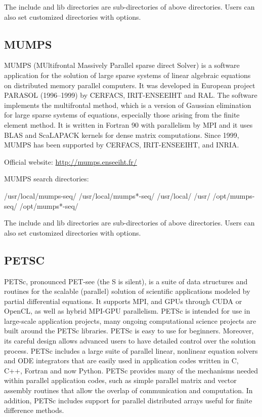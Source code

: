 The include and lib directories are sub-directories of above directories. Users can also set customized directories with options.

\subsection{MUMPS}
MUMPS (MUltifrontal Massively Parallel sparse direct Solver) is a software application for the solution of large sparse systems of linear algebraic equations on distributed memory parallel computers. It was developed in European project PARASOL (1996–1999) by CERFACS, IRIT-ENSEEIHT and RAL. The software implements the multifrontal method, which is a version of Gaussian elimination for large sparse systems of equations, especially those arising from the finite element method. It is written in Fortran 90 with parallelism by MPI and it uses BLAS and ScaLAPACK kernels for dense matrix computations. Since 1999, MUMPS has been supported by CERFACS, IRIT-ENSEEIHT, and INRIA. 

Official website: \url{http://mumps.enseeiht.fr/}

MUMPS search directories:
\begin{evb}
/usr/local/mumps-seq/
/usr/local/mumps*-seq/
/usr/local/
/usr/
/opt/mumps-seq/
/opt/mumps*-seq/
\end{evb}

The include and lib directories are sub-directories of above directories. Users can also set customized directories with options.

\subsection{PETSC}
PETSc, pronounced PET-see (the S is silent), is a suite of data structures and routines for the scalable (parallel) solution of scientific applications modeled by partial differential equations. It supports MPI, and GPUs through CUDA or OpenCL, as well as hybrid MPI-GPU parallelism. PETSc is intended for use in large-scale application projects, many ongoing computational science projects are built around the PETSc libraries. PETSc is easy to use for beginners. Moreover, its careful design allows advanced users to have detailed control over the solution process. PETSc includes a large suite of parallel linear, nonlinear equation solvers and ODE integrators that are easily used in application codes written in C, C++, Fortran and now Python. PETSc provides many of the mechanisms needed within parallel application codes, such as simple parallel matrix and vector assembly routines that allow the overlap of communication and computation. In addition, PETSc includes support for parallel distributed arrays useful for finite difference methods. 

